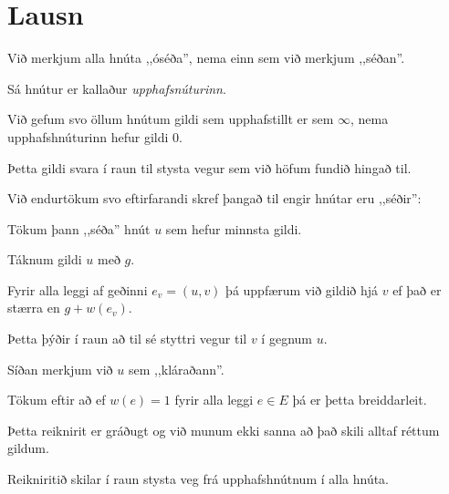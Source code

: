 \section{Lausn}
{
	{
		\item<1-> Við merkjum alla hnúta ,,óséða'', nema einn sem við merkjum ,,séðan''.
		\item<2-> Sá hnútur er kallaður \emph{upphafsnúturinn}.
		\item<3-> Við gefum svo öllum hnútum gildi sem upphafstillt er sem $\infty$, nema upphafshnúturinn hefur gildi $0$.
		\item<4-> Þetta gildi svara í raun til stysta vegur sem við höfum fundið hingað til.
		\item<5-> Við endurtökum svo eftirfarandi skref þangað til engir hnútar eru ,,séðir'':
		{
			\item<6-> Tökum þann ,,séða'' hnút $u$ sem hefur minnsta gildi.
			\item<7-> Táknum gildi $u$ með $g$.
			\item<8-> Fyrir alla leggi af geðinni $e_v = (u, v)$ þá uppfærum við gildið hjá $v$ ef það er stærra en $g + w(e_v)$.
			\item<9-> Þetta þýðir í raun að til sé styttri vegur til $v$ í gegnum $u$.
			\item<10-> Síðan merkjum við $u$ sem ,,kláraðann''.
		}
	}
}

{
	{
		\item<1-> Tökum eftir að ef $w(e) = 1$ fyrir alla leggi $e \in E$ þá er þetta breiddarleit.
		\item<2-> Þetta reiknirit er gráðugt og við munum ekki sanna að það skili alltaf réttum gildum.
		\item<3-> Reikniritið skilar í raun stysta veg frá upphafshnútnum í alla hnúta.
	}
}

